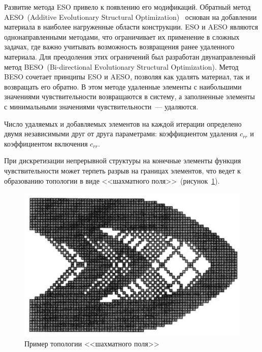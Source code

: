
Развитие метода ESO привело к появлению его модификаций. 
Обратный метод AESO~(Additive Evolutionary Structural Optimization)~\cite{Querin2000} основан на добавлении материала в наиболее нагруженные области конструкции. 
ESO и AESO являются однонаправленными методами, что ограничивает их применение в сложных задачах, где важно учитывать возможность возвращения ранее удаленного материала. Для преодоления этих ограничений был разработан двунаправленный метод BESO~(Bi-directional Evolutionary Structural Optimization){\cite{Querin1998, Yang1999}}. Метод BESO сочетает принципы ESO и AESO, позволяя как удалять материал, так и возвращать его обратно. В этом методе удаленные элементы с наибольшими значениями чувствительности возвращаются в систему, а заполненные элементы с минимальными значениями чувствительности~--- удаляются. 

Число удаляемых и добавляемых элементов на каждой итерации определено двумя независимыми друг от друга параметрами: коэффициентом удаления $c_{rr}$ и коэффициентом включения $c_{rr}$. 

При дискретизации непрерывной структуры на конечные элементы функция чувствительности может терпеть разрыв на границах элементов, что ведет к образованию топологии в виде <<шахматного поля>>~(рисунок~\cref{fig:chess_topology}).

\begin{figure}[ht]
	\centering 
	\includegraphics[scale=0.5]{Dissertation/images/chess.png} 
	\caption{Пример топологии <<шахматного поля>>}\label{fig:chess_topology}
\end{figure}

